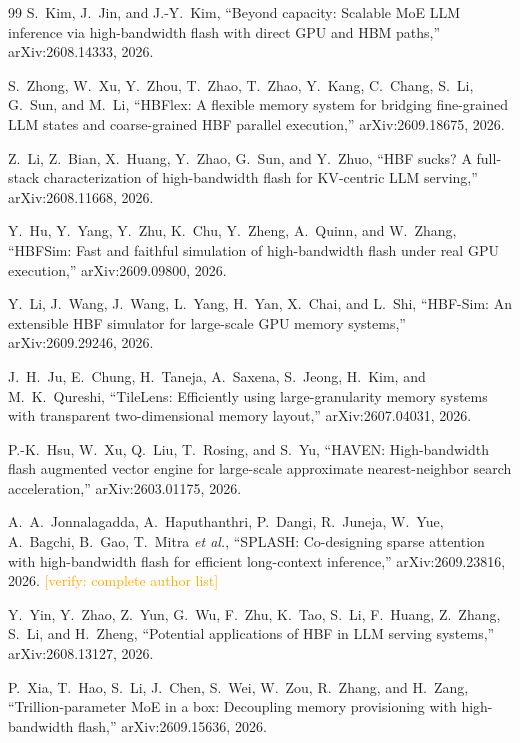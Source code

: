 \documentclass[conference,10pt]{IEEEtran}
\newcommand{\verify}[1]{\textcolor{orange}{[verify: #1]}}
\begin{document}
\begin{thebibliography}{99}
S.~Kim, J.~Jin, and J.-Y.~Kim, ``Beyond capacity: Scalable {MoE} {LLM}
inference via high-bandwidth flash with direct {GPU} and {HBM} paths,''
arXiv:2608.14333, 2026.

S.~Zhong, W.~Xu, Y.~Zhou, T.~Zhao, T.~Zhao, Y.~Kang, C.~Chang, S.~Li, G.~Sun,
and M.~Li, ``{HBFlex}: A flexible memory system for bridging fine-grained {LLM}
states and coarse-grained {HBF} parallel execution,'' arXiv:2609.18675, 2026.

Z.~Li, Z.~Bian, X.~Huang, Y.~Zhao, G.~Sun, and Y.~Zhuo, ``{HBF} sucks? {A}
full-stack characterization of high-bandwidth flash for {KV}-centric {LLM}
serving,'' arXiv:2608.11668, 2026.

Y.~Hu, Y.~Yang, Y.~Zhu, K.~Chu, Y.~Zheng, A.~Quinn, and W.~Zhang, ``{HBFSim}:
Fast and faithful simulation of high-bandwidth flash under real {GPU}
execution,'' arXiv:2609.09800, 2026.

Y.~Li, J.~Wang, J.~Wang, L.~Yang, H.~Yan, X.~Chai, and L.~Shi, ``{HBF-Sim}: An
extensible {HBF} simulator for large-scale {GPU} memory systems,''
arXiv:2609.29246, 2026.

J.~H.~Ju, E.~Chung, H.~Taneja, A.~Saxena, S.~Jeong, H.~Kim, and M.~K.~Qureshi,
``{TileLens}: Efficiently using large-granularity memory systems with
transparent two-dimensional memory layout,'' arXiv:2607.04031, 2026.

P.-K.~Hsu, W.~Xu, Q.~Liu, T.~Rosing, and S.~Yu, ``{HAVEN}: High-bandwidth flash
augmented vector engine for large-scale approximate nearest-neighbor search
acceleration,'' arXiv:2603.01175, 2026.

A.~A.~Jonnalagadda, A.~Haputhanthri, P.~Dangi, R.~Juneja, W.~Yue, A.~Bagchi,
B.~Gao, T.~Mitra \emph{et al.}, ``{SPLASH}: Co-designing sparse attention with
high-bandwidth flash for efficient long-context inference,''
arXiv:2609.23816, 2026. \verify{complete author list}

Y.~Yin, Y.~Zhao, Z.~Yun, G.~Wu, F.~Zhu, K.~Tao, S.~Li, F.~Huang, Z.~Zhang,
S.~Li, and H.~Zheng, ``Potential applications of {HBF} in {LLM} serving
systems,'' arXiv:2608.13127, 2026.

P.~Xia, T.~Hao, S.~Li, J.~Chen, S.~Wei, W.~Zou, R.~Zhang, and H.~Zang,
``Trillion-parameter {MoE} in a box: Decoupling memory provisioning with
high-bandwidth flash,'' arXiv:2609.15636, 2026.


\end{thebibliography}
\end{document}
